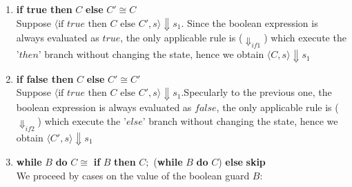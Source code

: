 \begin{solution}
\begin{enumerate}[label=(\alph*)]
\begin{enumerate}[label=(\alph{enumi}).\arabic*]
        \\
        Since $\langle (C;C'), s\rangle \Downarrow s'' $ there is another intermediate state $s'$ such that $\langle C, s\rangle \Downarrow s'$ and  $\langle C', s'\rangle \Downarrow s''$ 
        \\
        Applying ($\Downarrow_{seq}$) on $(C'; C'')$ from state $s'$, we obtain $\langle C'; C'', s'\rangle \Downarrow s_1$. Then we can execute $\langle C,s\rangle \Downarrow s'$ before again by ($\Downarrow_{seq}$) we conclude $\langle C;(C';C''), s\rangle \Downarrow s_1$, q.e.d.
        
        \item ($   \Longleftarrow$): Suppose that $\langle C; (C';C''), s\rangle \Downarrow s_1$, for this to happen,  by ($\Downarrow_{seq}$), there exists $s'$ such that $\langle C,s\rangle \Downarrow s'$ and $\langle (C'; C'', s'\rangle \Downarrow s_1$.
        \\ Since $\langle (C';C''), s\rangle \Downarrow s_1 $ there is another intermediate state $s''$ such that $\langle C', s'\rangle \Downarrow s''$ and  $\langle C'', s''\rangle \Downarrow s_1$ 
        \\
         Applying ($\Downarrow_{seq}$) we conclude $\langle (C;C');C'', s\rangle \Downarrow s_1$, q.e.d.
    \end{enumerate}
    \item \textbf{if true then} $C$ \textbf{else} $C' \cong C$
    \\
    Suppose  $\langle \text{if } true \text{ then } C \text{ else } C', s\rangle \Downarrow s_1$. Since the boolean expression is always evaluated as $true$, the only applicable rule is ($\Downarrow_{if1}$) which execute the '$then$' branch without changing the state, hence we obtain $\langle C,s\rangle \Downarrow s_1$ 
    \item \textbf{if false then} $C$ \textbf{else} $C' \cong C'$
    \\ 
    Suppose  $\langle \text{if } true \text{ then } C \text{ else } C', s\rangle \Downarrow s_1$.Specularly to the previous one, the boolean expression is always evaluated as $false$, the only applicable rule is ($\Downarrow_{if2}$) which execute the '$else$' branch without changing the state, hence we obtain $\langle C',s\rangle \Downarrow s_1$  
    \item \textbf{while} $B$ \textbf{do} $C \cong$ \textbf{if} $B$ \textbf{then} $C;$ (\textbf{while} $B$ \textbf{do} $C$) \textbf{else} \textbf{skip}
    \\
    We proceed by cases on the value of the boolean guard $B$:

\end{enumerate}
\end{solution}
